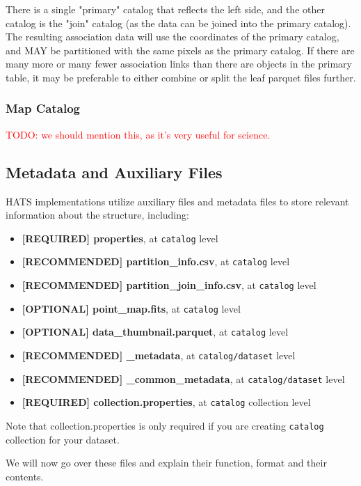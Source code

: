 \documentclass[11pt,a4paper]{ivoa}
\begin{document}
There is a single "primary" catalog that reflects the left side, and the other catalog is the "join" catalog (as the data can be joined into the primary catalog).
The resulting association data will use the coordinates of the primary catalog, and MAY be partitioned with the same pixels as the primary catalog.
If there are many more or many fewer association links than there are objects in the primary table, it may be preferable to either combine or split the leaf parquet files further.

\subsubsection{Map Catalog} \label{sec:mapCatalog}
\textcolor{red}{TODO: we should mention this, as it's very useful for science. }

\subsection{Metadata and Auxiliary Files} \label{sec:meta}
HATS implementations utilize auxiliary files and metadata files to store relevant information about the  structure, including:
\begin{itemize}
    \item \textbf{[REQUIRED] properties}, at  \texttt{catalog} level    
    \item \textbf{[RECOMMENDED] partition\_info.csv}, at  \texttt{catalog} level
    \item \textbf{[RECOMMENDED] partition\_join\_info.csv}, at  \texttt{catalog} level
    \item \textbf{[OPTIONAL] point\_map.fits}, at  \texttt{catalog} level
    \item \textbf{[OPTIONAL] data\_thumbnail.parquet}, at  \texttt{catalog} level
    \item \textbf{[RECOMMENDED] \_metadata}, at  \texttt{catalog/dataset} level
    \item \textbf{[RECOMMENDED] \_common\_metadata}, at  \texttt{catalog/dataset} level
    \item \textbf{[REQUIRED] collection.properties}, at  \texttt{catalog} collection level
\end{itemize}
    
Note that collection.properties is only required if you are creating  \texttt{catalog} collection for your dataset. \par 
We will now go over these files and explain their function, format and their contents. 
    
\end{document}

